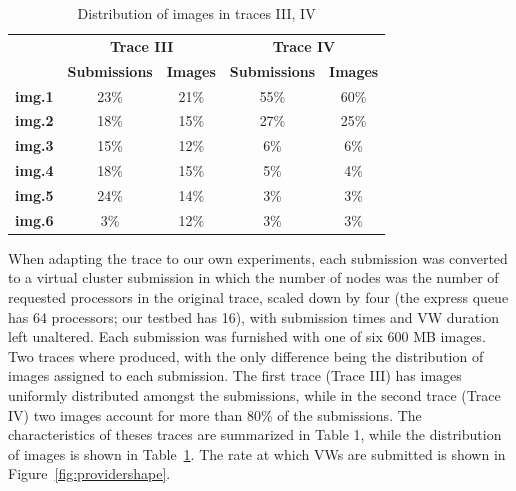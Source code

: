 \begin{table}
\begin{center}
\begin{tabular}{|c|c|c|c|c|}
\cline{2-5}
\multicolumn{1}{c|}{} &
\multicolumn{2}{c|}{\bfseries Trace III} &
\multicolumn{2}{c|}{\bfseries Trace IV}

\\\cline{2-5}

\multicolumn{1}{c|}{}  & {\bfseries Submissions} & {\bfseries Images} & {\bfseries Submissions} & {\bfseries Images} 

\\\hline

{\bfseries img.1} & 23\% & 21\% & 55\% & 60\%

\\\hline

{\bfseries img.2}
&
18\%
&
15\%
&
27\%
&
25\%

\\\hline

{\bfseries img.3}

&
15\%
&
12\%
&
6\%
&
6\%

\\\hline

{\bfseries img.4}
&
18\% 
&
15\%
&
5\%
&
4\%

\\\hline

{\bfseries img.5}
&
24\%
&
14\%
&
3\%
&
3\%

\\\hline

{\bfseries img.6}
&
3\%
&
12\%
&
3\%
&
3\%

\\\hline
\end{tabular}

\caption{Distribution of images in traces III, IV}
\label{tab:imagedistro}
\end{center}
\end{table}

When adapting the trace to our own experiments, each submission was
converted to a virtual cluster submission in which the number of nodes
was the number of requested processors in the original trace, scaled
down by four (the express queue has 64 processors; our testbed has 16),
with submission times and VW duration left unaltered. Each submission
was furnished with one of six 600 MB images. Two traces where produced,
with the only difference being the distribution of images assigned to
each submission. The first trace (Trace III) has images uniformly
distributed amongst the submissions, while in the second trace (Trace
IV) two images account for more than 80\% of the submissions. The
characteristics of theses traces are summarized in Table 1, while the
distribution of images is shown in Table~\ref{tab:imagedistro}. The rate at which VWs are
submitted is shown in Figure~\ref{fig:providershape}.

